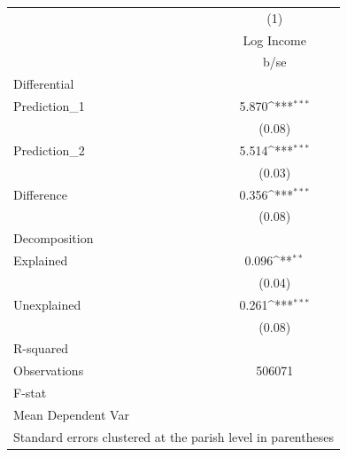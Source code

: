 {
\def\sym#1{\ifmmode^{#1}\else\(^{#1}\)\fi}
\begin{tabular}{l*{1}{c}}
\hline\hline
                    &\multicolumn{1}{c}{(1)}\\
                    &\multicolumn{1}{c}{Log Income}\\
                    &        b/se         \\
\hline
Differential        &                     \\
Prediction\_1        &       5.870\sym{***}\\
                    &      (0.08)         \\
Prediction\_2        &       5.514\sym{***}\\
                    &      (0.03)         \\
Difference          &       0.356\sym{***}\\
                    &      (0.08)         \\
\hline
Decomposition       &                     \\
Explained           &       0.096\sym{**} \\
                    &      (0.04)         \\
Unexplained         &       0.261\sym{***}\\
                    &      (0.08)         \\
\hline
R-squared           &                     \\
Observations        &      506071         \\
F-stat              &                     \\
Mean Dependent Var  &                     \\
\hline\hline
\multicolumn{2}{l}{\footnotesize Standard errors clustered at the parish level in parentheses}\\
\end{tabular}
}
